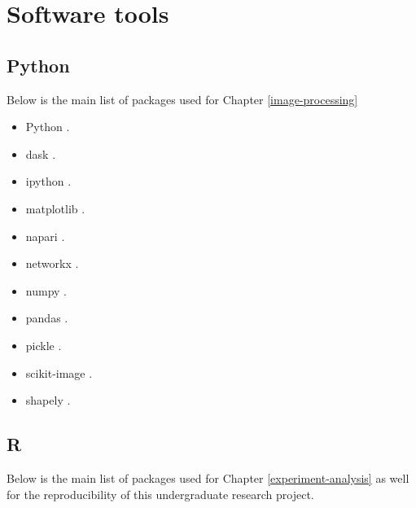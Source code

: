 \documentclass[
  12pt,
  a4paper,
  oneside]{krantz}
\begin{document}
\hypertarget{software-tools}{%
\chapter{Software tools}\label{software-tools}}

\hypertarget{python}{%
\section{Python}\label{python}}

Below is the main list of packages used for Chapter
\ref{image-processing}

\begin{itemize}
\item
  Python \citep{10.5555/1593511}.
\item
  dask \citep{rocklin2015dask}.
\item
  ipython \citep{perez2007ipython}.
\item
  matplotlib \citep{hunter2007matplotlib}.
\item
  napari \citep{sofroniew2021a}.
\item
  networkx \citep{hagberg2008exploring}.
\item
  numpy \citep{2020NumPy-Array}.
\item
  pandas \citep{mckinney2010data}.
\item
  pickle \citep{van1995python}.
\item
  scikit-image \citep{vanderwalt2014}.
\item
  shapely \citep{shapely2007}.
\end{itemize}

\hypertarget{r}{%
\section{R}\label{r}}

Below is the main list of packages used for Chapter
\ref{experiment-analysis} as well for the reproducibility of this
undergraduate research project.
\end{document}
